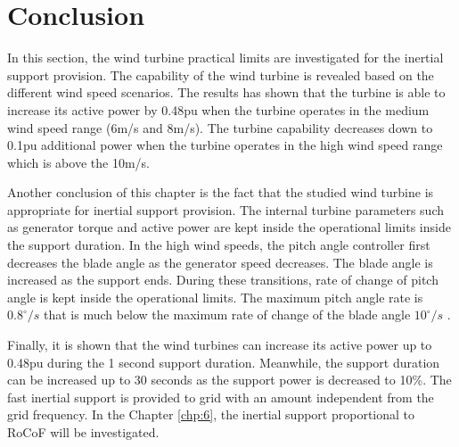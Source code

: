 \section{Conclusion}
In this section, the wind turbine practical limits are investigated for the inertial support provision. The capability of the wind turbine is revealed based on the different wind speed scenarios. The results has shown that the turbine is able to increase its active power by 0.48pu when the turbine operates in the medium wind speed range (6m/s and 8m/s). The turbine capability decreases down to 0.1pu additional power when the turbine operates in the high wind speed range which is above the 10m/s.\par
Another conclusion of this chapter is the fact that the studied wind turbine is appropriate for inertial support provision. The internal turbine parameters such as generator torque and active power are kept inside the operational limits inside the support duration. In the high wind speeds, the pitch angle controller first decreases the blade angle as the generator speed decreases. The blade angle is increased as the support ends. During these transitions, rate of change of pitch angle is kept inside the operational limits. The maximum pitch angle rate is $0.8^{\circ}/s$ that is much below the maximum rate of change of the blade angle $10^{\circ}/s$ \cite{Ackermann2005a}.\par
Finally, it is shown that the wind turbines can increase its active power up to 0.48pu during the 1 second support duration. Meanwhile, the support duration can be increased up to 30 seconds as the support power is decreased to 10\%. The fast inertial support is provided to grid with an amount independent from the grid frequency. In the Chapter \ref{chp:6}, the inertial support proportional to RoCoF will be investigated. 